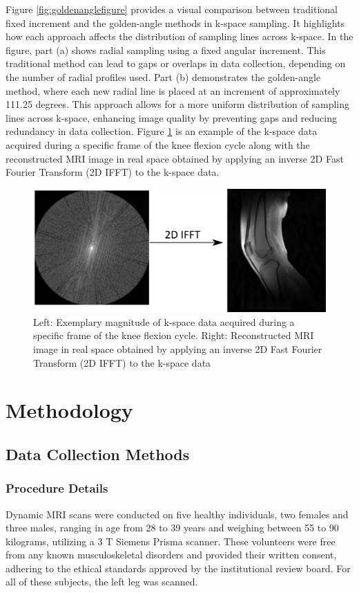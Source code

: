 \documentclass{micro-econ-thesis}
\begin{document}
 
Figure \ref{fig:goldenanglefigure} provides a visual comparison between traditional fixed increment and the golden-angle methods in k-space sampling. It highlights how each approach affects the distribution of sampling lines across k-space. In the figure, part (a) shows radial sampling using a fixed angular increment. This traditional method can lead to gaps or overlaps in data collection, depending on the number of radial profiles used. Part (b) demonstrates the golden-angle method, where each new radial line is placed at an increment of approximately 111.25 degrees. This approach allows for a more uniform distribution of sampling lines across k-space, enhancing image quality by preventing gaps and reducing redundancy in data collection. Figure \ref{fig:kspacearrow} is an example of the k-space data acquired during a specific frame of the knee flexion cycle along with  the reconstructed MRI image in real space obtained by applying an inverse 2D Fast Fourier Transform (2D IFFT) to the k-space data.
\begin{figure}[H]
	\centering
	\includegraphics[scale=0.3]{kspace_arrow_2}
	\caption{Left: Exemplary magnitude of k-space data acquired during a specific frame of the knee flexion cycle. Right: Reconstructed MRI image in real space obtained by applying an inverse 2D Fast Fourier Transform (2D IFFT) to the k-space data}
	\label{fig:kspacearrow}
\end{figure}
  


\section{Methodology}
\label{sec:second}

\subsection{Data Collection Methods}

\subsubsection{Procedure Details}
Dynamic MRI scans were conducted on five healthy individuals, two females and three males, ranging in age from 28 to 39 years and weighing between 55 to 90 kilograms, utilizing a 3 T Siemens Prisma scanner. These volunteers were free from any known musculoskeletal disorders and provided their written consent, adhering to the ethical standards approved by the institutional review board. For all of these subjects, the left leg was scanned. 
\end{document}
